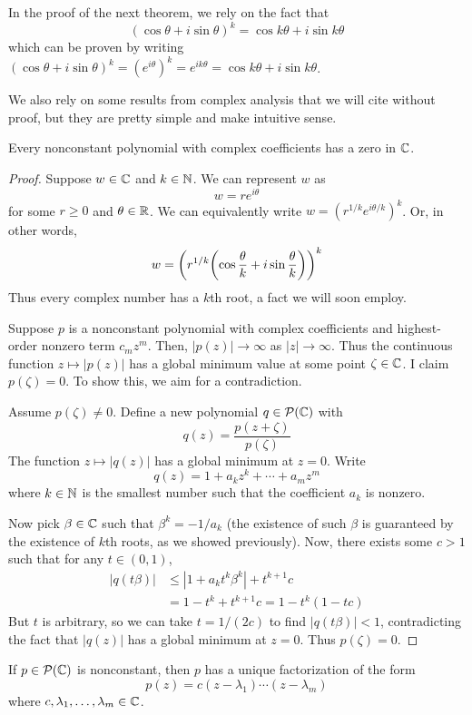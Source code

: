 In the proof of the next theorem, we rely on the fact that
\[ (\cos\theta + i\sin\theta)^k = \cos k\theta + i\sin k\theta \]
which can be proven by writing $(\cos\theta + i\sin\theta)^k = (e^{i\theta})^k = e^{ik\theta} = \cos k\theta + i\sin k\theta$.

We also rely on some results from complex analysis that we will cite without proof, but they are pretty simple and make intuitive sense.
\begin{theorem}
    Every nonconstant polynomial with complex coefficients has a zero in $\mathbb{C}$.
\end{theorem}
\begin{proof}
    Suppose $w\in\mathbb{C}$ and $k\in\mathbb{N}$. We can represent $w$ as 
    \[ w = re^{i\theta} \]
    for some $r \ge 0$ and $\theta\in\mathbb{R}$. We can equivalently write $w = (r^{1/k}e^{i\theta/k})^k$. Or, in other words,
    \[ w = \pqty{r^{1/k}\pqty{\cos\frac{\theta}{k}+i\sin\frac{\theta}{k}}}^k\]
    Thus every complex number has a $k$th root, a fact we will soon employ.

    Suppose $p$ is a nonconstant polynomial with complex coefficients and highest-order nonzero term $c_mz^m$. Then, $|p(z)|\to\infty$ as $|z|\to\infty$. Thus the continuous function $z \mapsto |p(z)|$ has a global minimum value at some point $\zeta\in\mathbb{C}$. I claim $p(\zeta) = 0$. To show this, we aim for a contradiction. 
    
    Assume $p(\zeta) \ne 0$. Define a new polynomial $q\in\mathcal{P}(\mathbb{C})$ with
    \[ q(z) = \frac{p(z+\zeta)}{p(\zeta)} \]
    The function $z\mapsto |q(z)|$ has a global minimum at $z=0$. Write
    \[ q(z) = 1 + a_kz^k + \cdots + a_mz^m \]
    where $k\in\mathbb{N}$ is the smallest number such that the coefficient $a_k$ is nonzero. 

    Now pick $\beta\in\mathbb{C}$ such that $\beta^k = -1/a_k$ (the existence of such $\beta$ is guaranteed by the existence of $k$th roots, as we showed previously). Now, there exists some $c > 1$ such that for any $t\in(0,1)$,
    \begin{align*}
        |q(t\beta)| &\le |1 + a_kt^k\beta^k| + t^{k+1}c \\
        &= 1 - t^k + t^{k+1}c = 1 - t^k(1 - tc)
    \end{align*}
    But $t$ is arbitrary, so we can take $t = 1/(2c)$ to find $|q(t\beta)| < 1 $, contradicting the fact that $|q(z)|$ has a global minimum at $z=0$. Thus $p(\zeta) = 0$. 
\end{proof}
\begin{theorem}
    If $p\in\mathcal{P}(\mathbb{C})$ is nonconstant, then $p$ has a unique factorization of the form
    \[ p(z) = c(z-\lambda_1)\cdots(z-\lambda_m)\]
    where $c,\lambda_1,\dots,\lambda_m\in\mathbb{C}$.
\end{theorem}
